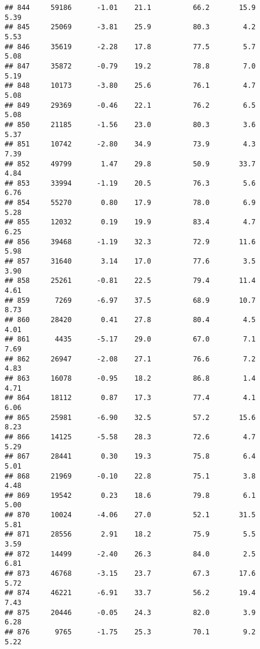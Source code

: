 \documentclass[
]{article}
\begin{document}
\begin{verbatim}
## 844     59186      -1.01    21.1          66.2       15.9              5.39
## 845     25069      -3.81    25.9          80.3        4.2              5.53
## 846     35619      -2.28    17.8          77.5        5.7              5.08
## 847     35872      -0.79    19.2          78.8        7.0              5.19
## 848     10173      -3.80    25.6          76.1        4.7              5.08
## 849     29369      -0.46    22.1          76.2        6.5              5.08
## 850     21185      -1.56    23.0          80.3        3.6              5.37
## 851     10742      -2.80    34.9          73.9        4.3              7.39
## 852     49799       1.47    29.8          50.9       33.7              4.84
## 853     33994      -1.19    20.5          76.3        5.6              6.76
## 854     55270       0.80    17.9          78.0        6.9              5.28
## 855     12032       0.19    19.9          83.4        4.7              6.25
## 856     39468      -1.19    32.3          72.9       11.6              5.98
## 857     31640       3.14    17.0          77.6        3.5              3.90
## 858     25261      -0.81    22.5          79.4       11.4              4.61
## 859      7269      -6.97    37.5          68.9       10.7              8.73
## 860     28420       0.41    27.8          80.4        4.5              4.01
## 861      4435      -5.17    29.0          67.0        7.1              7.69
## 862     26947      -2.08    27.1          76.6        7.2              4.83
## 863     16078      -0.95    18.2          86.8        1.4              4.71
## 864     18112       0.87    17.3          77.4        4.1              6.06
## 865     25981      -6.90    32.5          57.2       15.6              8.23
## 866     14125      -5.58    28.3          72.6        4.7              5.29
## 867     28441       0.30    19.3          75.8        6.4              5.01
## 868     21969      -0.10    22.8          75.1        3.8              4.48
## 869     19542       0.23    18.6          79.8        6.1              5.00
## 870     10024      -4.06    27.0          52.1       31.5              5.81
## 871     28556       2.91    18.2          75.9        5.5              3.59
## 872     14499      -2.40    26.3          84.0        2.5              6.81
## 873     46768      -3.15    23.7          67.3       17.6              5.72
## 874     46221      -6.91    33.7          56.2       19.4              7.43
## 875     20446      -0.05    24.3          82.0        3.9              6.28
## 876      9765      -1.75    25.3          70.1        9.2              5.22

\end{verbatim}
\end{document}
